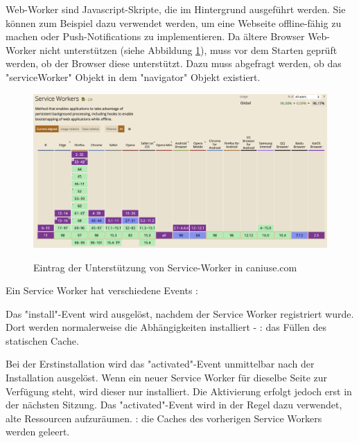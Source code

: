 

Web-Worker sind Javascript-Skripte, die im Hintergrund ausgeführt werden. 
Sie können zum Beispiel dazu verwendet werden, um eine Webseite offline-fähig zu machen oder Push-Notifications zu implementieren.
Da ältere Browser Web-Worker nicht unterstützen (siehe Abbildung \ref{fig:CanIUseServiceWorker}), muss vor dem Starten geprüft werden, ob der Browser diese unterstützt. 
Dazu muss abgefragt werden, ob das "serviceWorker" Objekt in dem "navigator" Objekt existiert. 

\begin{figure}[H]
    \centering
    \includegraphics[width=\textwidth]{media/ServiceWorker/CanIUseServiceWorker.png}
    \caption{Eintrag der Unterstützung von Service-Worker in caniuse.com}
    \cite{ciuServiceWorker}
    \label{fig:CanIUseServiceWorker}
\end{figure}

\clearpage


Ein Service Worker hat verschiedene Events \cite{MDNCacheAPI}: 


Das "install"-Event wird ausgelöst, nachdem der Service Worker registriert wurde. Dort werden normalerweise die Abhängigkeiten installiert - \zb: das Füllen des statischen Cache.
    

Bei der Erstinstallation wird das "activated"-Event unmittelbar nach der Installation ausgelöst.
Wenn ein neuer Service Worker für dieselbe Seite zur Verfügung steht, wird dieser nur installiert.
Die Aktivierung erfolgt jedoch erst in der nächsten Sitzung.
Das "activated"-Event wird in der Regel dazu verwendet, alte Ressourcen aufzuräumen. \zb: die Caches des vorherigen Service Workers werden geleert.

